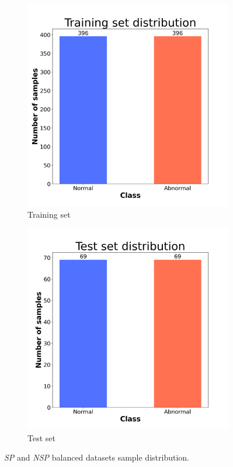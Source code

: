 \begin{figure}[H]
  \centering
  \begin{subfigure}[t]{0.45\textwidth}
      \centering
      \includegraphics[width=1\textwidth]{images/exper1/SP/train_dist.png}
      \caption{Training set}
  \end{subfigure}
  \begin{subfigure}[t]{0.45\textwidth}
      \centering
      \includegraphics[width=1\textwidth]{images/exper1/SP/test_dist.png}
      \caption{Test set}
  \end{subfigure}
  \caption{\textit{SP} and \textit{NSP} balanced datasets sample distribution.}
\end{figure}

